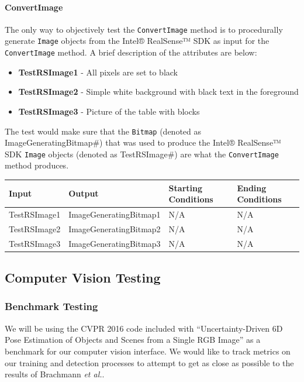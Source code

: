 \documentclass[12pt]{article}
\providecommand{\tightlist}{%
  \setlength{\itemsep}{0pt}\setlength{\parskip}{0pt}}
\begin{document}
\paragraph{ConvertImage}\label{convertimage}

The only way to objectively test the \texttt{ConvertImage} method is to
procedurally generate \texttt{Image} objects from the Intel® RealSense™
SDK as input for the \texttt{ConvertImage} method. A brief description
of the attributes are below:

\begin{itemize}
\tightlist
\item
  \textbf{TestRSImage1} - All pixels are set to black
\item
  \textbf{TestRSImage2} - Simple white background with black text in the
  foreground
\item
  \textbf{TestRSImage3} - Picture of the table with blocks
\end{itemize}

The test would make sure that the \texttt{Bitmap} (denoted as
ImageGeneratingBitmap\#) that was used to produce the Intel® RealSense™
SDK \texttt{Image} objects (denoted as TestRSImage\#) are what the
\texttt{ConvertImage} method produces.

\begin{longtable}[]{@{}llll@{}}
\toprule
Input & Output & Starting Conditions & Ending Conditions\tabularnewline
\midrule
\endhead
TestRSImage1 & ImageGeneratingBitmap1 & N/A & N/A\tabularnewline
TestRSImage2 & ImageGeneratingBitmap2 & N/A & N/A\tabularnewline
TestRSImage3 & ImageGeneratingBitmap3 & N/A & N/A\tabularnewline
\bottomrule
\end{longtable}

\subsection{Computer Vision Testing}\label{computer-vision-testing}

\subsubsection{Benchmark Testing}\label{benchmark-testing}

We will be using the CVPR 2016 code included with ``Uncertainty-Driven
6D Pose Estimation of Objects and Scenes from a Single RGB Image'' as a
benchmark for our computer vision interface. We would like to track
metrics on our training and detection processes to attempt to get as
close as possible to the results of Brachmann \emph{et al.}.
\end{document}
